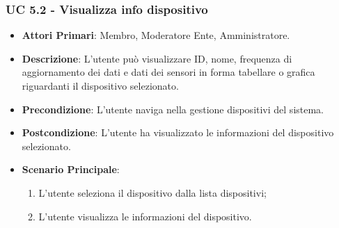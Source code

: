 			\subsubsection{UC 5.2 - Visualizza info dispositivo}
			\begin{itemize}
				\item \textbf{Attori Primari}: Membro, Moderatore Ente, Amministratore.
				\item \textbf{Descrizione}: L'utente può visualizzare ID, nome, frequenza di aggiornamento dei dati e dati dei sensori in forma tabellare o grafica riguardanti il dispositivo selezionato.
				\item \textbf{Precondizione}: L'utente naviga nella gestione dispositivi del sistema.
				\item \textbf{Postcondizione}: L'utente ha visualizzato le informazioni del dispositivo selezionato.
				\item \textbf{Scenario Principale}:
				\begin{enumerate}
					\item{L'utente seleziona il dispositivo dalla lista dispositivi;}
					\item{L'utente visualizza le informazioni del dispositivo.}
				\end{enumerate}
			\end{itemize}
			
